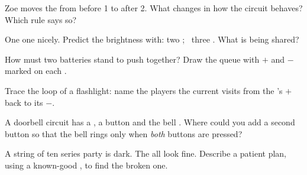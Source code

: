 \begin{exercise}[$\star$]\label{exo:g4:series-circuits:4}
Zoe moves the  from before  1 to after  2. What
changes in how the circuit behaves? Which rule says so?
\end{exercise}

\begin{exercise}[$\star$]\label{exo:g4:series-circuits:5}
One   one  nicely. Predict the brightness with:
two  ; \ three  . What is being shared?
\end{exercise}

\begin{exercise}[$\star$]\label{exo:g4:series-circuits:6}
How must two batteries stand to push together? Draw the queue with
$+$ and $-$ marked on each .
\end{exercise}

\begin{exercise}[$\star$]\label{exo:g4:series-circuits:7}
Trace the loop of a flashlight: name the players the current visits
from the 's $+$ back to its $-$.
\end{exercise}

\begin{exercise}[$\star$]\label{exo:g4:series-circuits:8}
A doorbell circuit has a , a button and the bell .
Where could you add a second button so that the bell rings only
when \emph{both} buttons are pressed?
\end{exercise}

\begin{exercise}[$\star$]\label{exo:g4:series-circuits:9}
A string of ten series party  is dark. The  all look
fine. Describe a patient plan, using a known-good , to find the
broken one.
\end{exercise}

